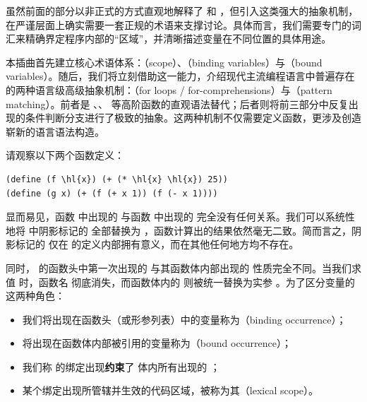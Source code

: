 
\label{sec:intermezzo03}

虽然前面的部分以非正式的方式直观地解释了  和 ，但引入这类强大的抽象机制，在严谨层面上确实需要一套正规的术语来支撑讨论。具体而言，我们需要专门的词汇来精确界定程序内部的“区域”，并清晰描述变量在不同位置的具体用途。

本插曲首先建立核心术语体系：（scope）、（binding variables）与（bound variables）。随后，我们将立刻借助这一能力，介绍现代主流编程语言中普遍存在的两种语言级高级抽象机制：（for loops / for-comprehensions）与（pattern matching）。前者是 、、 等高阶函数的直观语法替代；后者则将前三部分中反复出现的条件判断分支进行了极致的抽象。这两种机制不仅需要定义函数，更涉及创造崭新的语言语法构造。

\label{sec:intermezzo03_scope}

请观察以下两个函数定义：

\begin{stepperbox}[unbreakable]
\begin{Verbatim}[commandchars=\\\{\}, fontsize=\footnotesize]
(define (f \hl{x}) (+ (* \hl{x} \hl{x}) 25))
(define (g x) (+ (f (+ x 1)) (f (- x 1))))
\end{Verbatim}
\end{stepperbox}

显而易见，函数  中出现的  与函数  中出现的  完全没有任何关系。我们可以系统性地将  中阴影标记的  全部替换为 ，函数计算出的结果依然毫无二致。简而言之，阴影标记的  仅在  的定义内部拥有意义，而在其他任何地方均不存在。

同时， 的函数头中第一次出现的  与其函数体内部出现的  性质完全不同。当我们求值  时，函数名  彻底消失，而函数体内的  则被统一替换为实参 。为了区分变量的这两种角色：
\begin{itemize}
  \item 我们将出现在函数头（或形参列表）中的变量称为（binding occurrence）；
  \item 将出现在函数体内部被引用的变量称为（bound occurrence）；
  \item 我们称  的绑定出现\textbf{约束}了  体内所有出现的 ；
  \item 某个绑定出现所管辖并生效的代码区域，被称为其（lexical scope）。
\end{itemize}

